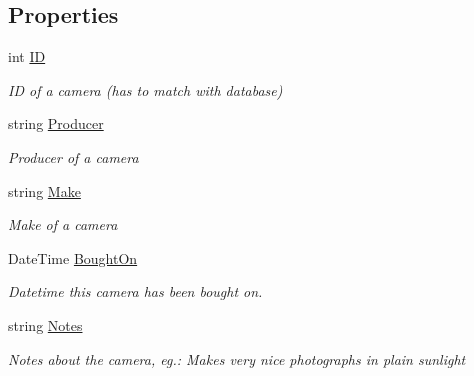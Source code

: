 \subsection*{Properties}
\begin{DoxyCompactItemize}
\item 
int \mbox{\hyperlink{class_pic_d_b_1_1_models_1_1_camera_model_a31394a505a536d6c692e4fc4b76213f4}{ID}}
\begin{DoxyCompactList}\small\item\em ID of a camera (has to match with database) \end{DoxyCompactList}\item 
string \mbox{\hyperlink{class_pic_d_b_1_1_models_1_1_camera_model_a95db2c039e55aced4faa69e95ce8423a}{Producer}}
\begin{DoxyCompactList}\small\item\em Producer of a camera \end{DoxyCompactList}\item 
string \mbox{\hyperlink{class_pic_d_b_1_1_models_1_1_camera_model_a7ab050807d92e1a2d5c6f6124b9c9b87}{Make}}
\begin{DoxyCompactList}\small\item\em Make of a camera \end{DoxyCompactList}\item 
Date\+Time \mbox{\hyperlink{class_pic_d_b_1_1_models_1_1_camera_model_a553208926883eeab6ef3b58d031e480c}{Bought\+On}}
\begin{DoxyCompactList}\small\item\em Datetime this camera has been bought on. \end{DoxyCompactList}\item 
string \mbox{\hyperlink{class_pic_d_b_1_1_models_1_1_camera_model_abc8338ceef1715e0bc03b842b692d43f}{Notes}}
\begin{DoxyCompactList}\small\item\em Notes about the camera, eg.\+: \textquotesingle{}Makes very nice photographs in plain sunlight\textquotesingle{} \end{DoxyCompactList}\item 

\end{DoxyCompactItemize}
